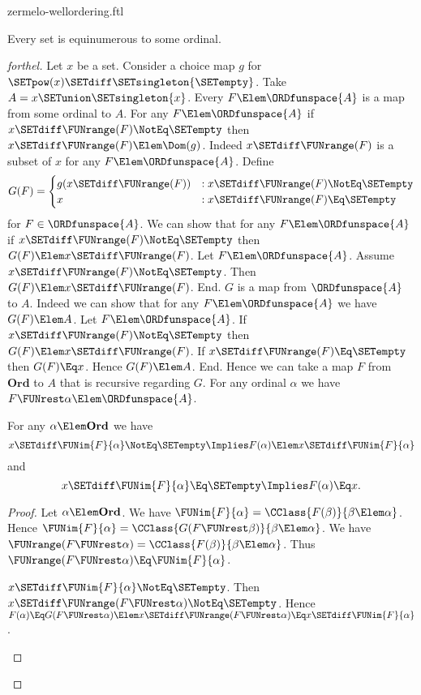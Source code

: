 \documentclass{stex}
\newcommand\Ord{\textbf{Ord}}
\begin{document}
\begin{smodule}{zermelo-wellordering.ftl}
\begin{theorem}[forthel,title=Zermelo's Well-Ordering Theorem,name=Zermelo]
  Every set is equinumerous to some ordinal.
\end{theorem}
\begin{proof}[forthel]
  Let $x$ be a set.
  Consider a choice map $g$ for $\SETpow(x) \SETdiff \SETsingleton{\SETempty}$.
  Take $A = x \SETunion \SETsingleton{x}$.
  Every $F \Elem \ORDfunspace{A}$ is a map from some ordinal to $A$.
  For any $F \Elem \ORDfunspace{A}$ if $x \SETdiff \FUNrange(F) \NotEq \SETempty$ then $x \SETdiff \FUNrange(F) \Elem \Dom(g)$.
  Indeed $x \SETdiff \FUNrange(F)$ is a subset of $x$ for any $F \Elem \ORDfunspace{A}$.
  Define \[ G(F) =
    \begin{cases}
      g(x \SETdiff \FUNrange(F))
      & : x \SETdiff \FUNrange(F) \NotEq \SETempty
      \\
      x
      & : x \SETdiff \FUNrange(F) \Eq \SETempty
    \end{cases} \]
  for $F \in \ORDfunspace{A}$.
  We can show that for any $F \Elem \ORDfunspace{A}$ if $x \SETdiff \FUNrange(F) \NotEq \SETempty$ then $G(F) \Elem x \SETdiff \FUNrange(F)$.
    Let $F \Elem \ORDfunspace{A}$.
    Assume $x \SETdiff \FUNrange(F) \NotEq \SETempty$.  
    Then $G(F) \Elem x \SETdiff \FUNrange(F)$.
  End.
  $G$ is a map from $\ORDfunspace{A}$ to $A$.
  Indeed we can show that for any $F \Elem \ORDfunspace{A}$ we have $G(F) \Elem A$.
    Let $F \Elem \ORDfunspace{A}$.
    If $x \SETdiff \FUNrange(F) \NotEq \SETempty$ then $G(F) \Elem x \SETdiff \FUNrange(F)$.
    If $x \SETdiff \FUNrange(F) \Eq \SETempty$ then $G(F) \Eq x$.
    Hence $G(F) \Elem A$.
  End.
  Hence we can take a map $F$ from $\Ord$ to $A$ that is recursive regarding $G$.
  For any ordinal $\alpha$ we have $F \FUNrest \alpha \Elem \ORDfunspace{A}$.

  For any $\alpha \Elem \Ord$ we have
  \[ x \SETdiff \FUNim{F}{\alpha} \NotEq \SETempty \Implies F(\alpha) \Elem x \SETdiff \FUNim{F}{\alpha} \]
  and
  \[ x \SETdiff \FUNim{F}{\alpha} \Eq \SETempty \Implies F(\alpha) \Eq x. \]
  \begin{proof}
    Let $\alpha \Elem \Ord$.
    We have $\FUNim{F}{\alpha} = \CClass{F(\beta)}{\beta \Elem \alpha}$.
    Hence $\FUNim{F}{\alpha} = \CClass{G(F \FUNrest \beta)}{\beta \Elem \alpha}$.
    We have $\FUNrange(F \FUNrest \alpha) = \CClass{F(\beta)}{\beta \Elem \alpha}$.
    Thus $\FUNrange(F \FUNrest \alpha) \Eq \FUNim{F}{\alpha}$.

    \begin{case}{$x \SETdiff \FUNim{F}{\alpha} \NotEq \SETempty$.}
      Then $x \SETdiff \FUNrange(F \FUNrest \alpha) \NotEq \SETempty$.
      Hence $F(\alpha)
        \Eq G(F \FUNrest \alpha)
        \Elem x \SETdiff \FUNrange(F \FUNrest \alpha)
        \Eq x \SETdiff \FUNim{F}{\alpha}$.
    \end{case}


\end{proof}
\end{proof}
\end{smodule}
\end{document}
